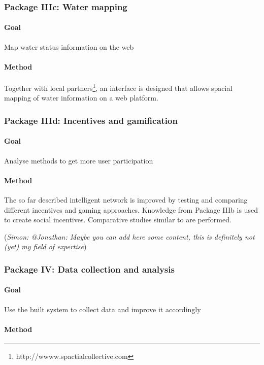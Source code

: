 \documentclass[11pt]{article}
\newcommand{\simon}[1]{\vspace{1em}(\emph{Simon: #1})\vspace{1em}}
\begin{document}
\subsubsection*{Package IIIc: Water mapping}
\paragraph{Goal} Map water status information on the web
\paragraph{Method} Together with local partners\footnote{http://wwww.spactialcollective.com}, an interface is designed that allows spacial mapping of water information on a web platform.

\subsubsection*{Package IIId: Incentives and gamification}
\paragraph{Goal} Analyse methods to get more user participation
\paragraph{Method}
The so far described intelligent network is improved by testing and comparing different incentives and gaming approaches. Knowledge from Package IIIb is used to create social incentives. Comparative studies similar to \cite{blaschkeextrinsic} are performed. 

\simon{@Jonathan: Maybe you can add here some content, this is definitely not (yet) my field of expertise}

\subsubsection*{Package IV: Data collection and analysis}
\paragraph{Goal} Use the built system to collect data and improve it accordingly
\paragraph{Method}
\end{document}

